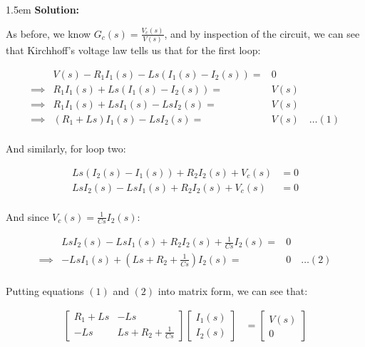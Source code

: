 \documentclass{article}
\newenvironment{solution}{
	\vspace{.5em}
	\par
	\begin{adjustwidth}{1.5em}{}
	\textbf{{Solution:}}
	\par
	\vspace{.5em}
}{
	\vspace{1em}
	\end{adjustwidth}
}
\begin{document}
\begin{solution}
	As before, we know $G_c(s) = \frac{V_c(s)}{V(s)}$, and by inspection of the circuit, we can see that Kirchhoff's voltage law tells us that for the first loop:

	\begin{equation*}
		\begin{array}{lrl}
			& V(s) - R_1 I_1(s) - Ls(I_1(s) - I_2(s)) =& 0 \\
			\implies & R_1 I_1(s) + Ls(I_1(s) - I_2(s)) =& V(s) \\
			\implies & R_1 I_1(s) + Ls I_1(s) - Ls I_2(s) =& V(s) \\
			\implies & (R_1 + Ls) I_1(s) - Ls I_2(s) =& V(s) \quad \ldots (1) \\
		\end{array}
	\end{equation*}

	\vspace{0.5em}

	And similarly, for loop two:

	\begin{align*}
		Ls(I_2(s) - I_1(s)) + R_2 I_2(s) + V_c(s) &= 0 \\
		Ls I_2(s) - Ls I_1(s) + R_2 I_2(s) + V_c(s) &= 0 \\
	\end{align*}

	And since $V_c(s) = \frac{1}{Cs} I_2(s)$:

	\begin{equation*}
		\begin{array}{lrl}
			& Ls I_2(s) - Ls I_1(s) + R_2 I_2(s) + \tfrac{1}{Cs} I_2(s) =& 0 \\
			\implies & -Ls I_1(s) + \left( Ls + R_2 + \tfrac{1}{Cs} \right) I_2(s) =& 0 \quad \ldots (2) \\
		\end{array}
	\end{equation*}

	\vspace{0.5em}

	Putting equations $(1)$ and $(2)$ into matrix form, we can see that:

	\begin{align*}
		\begin{bmatrix} R_1 + Ls & -Ls \\ -Ls & Ls + R_2 + \tfrac{1}{Cs} \end{bmatrix} \begin{bmatrix} I_1(s) \\ I_2(s) \end{bmatrix} &= \begin{bmatrix} V(s) \\ 0 \end{bmatrix} \\
	\end{align*}


\end{solution}
\end{document}
